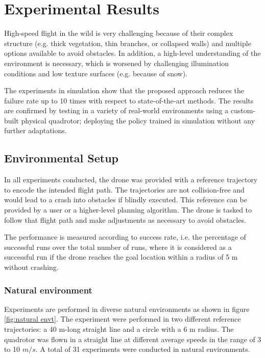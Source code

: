 \chapter{Experimental Results}

High-speed flight in the wild is very challenging because of their complex structure (e.g. thick vegetation, thin branches, or collapsed walls) and multiple options available to avoid obstacles. In addition, a high-level understanding of the environment is necessary, which is worsened by challenging illumination conditions and low texture surfaces (e.g. because of snow). 

The experiments in simulation show that the proposed approach reduces the failure rate up to 10 times with respect to state-of-the-art methods. The results are confirmed by testing in a variety of real-world environments using a custom-built physical quadrotor; deploying the policy trained in simulation without any further adaptations. 

\section{Environmental Setup}

In all experiments conducted, the drone was provided with a reference trajectory to encode the intended
flight path. The trajectories are not collision-free and would lead to a crash into obstacles if blindly executed. This reference can be provided by a user or a higher-level planning algorithm. The drone is tasked to follow that flight path and make adjustments as necessary to avoid obstacles. 

The performance is measured according to success rate, i.e. the percentage of successful runs over the total number of runs, where it is considered as a successful run if the drone reaches the goal location within a radius of 5 m without crashing. 

\subsection{Natural environment}
Experiments are performed in diverse natural environments as shown in figure \ref{fig:natural envt}. The experiment were performed in two different reference trajectories:
a 40 m-long straight line and a circle with a 6 m radius. The quadrotor was flown in a straight line at
different average speeds in the range of 3 to 10 $m/s$. A total of 31 experiments were conducted in natural environments.

